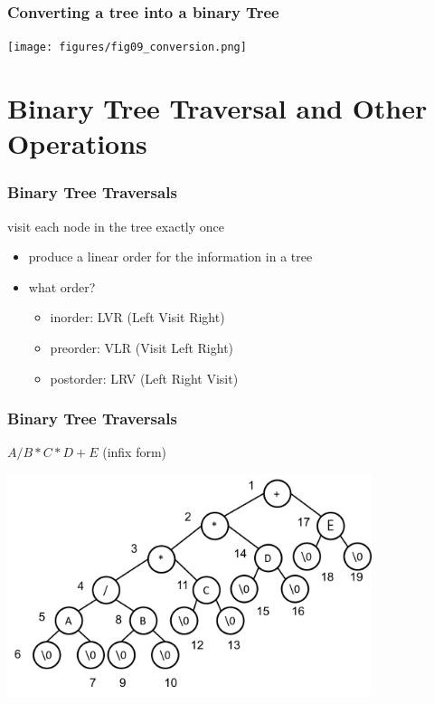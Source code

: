 \documentclass[newPxFont,sthlmFooter,nooffset]{beamer}
\begin{document}
\begin{frame}[t]
  \frametitle{Converting a tree into a binary Tree}
  \begin{center}
    \texttt{[image: figures/fig09\_conversion.png]}
  \end{center}

\end{frame}


\section{Binary Tree Traversal and Other Operations}
\begin{frame}[t]
  \frametitle{Binary Tree Traversals}
visit each node in the tree exactly once
\begin{itemize}
\item produce a linear order for the information in a tree
\item what order?
  \begin{itemize}
  \item inorder: LVR (Left Visit Right)
  \item preorder: VLR (Visit Left Right)
  \item postorder: LRV (Left Right Visit)
  \end{itemize}
\end{itemize}

\end{frame}


\begin{frame}[t]
  \frametitle{Binary Tree Traversals}
$A/B*C*D+E$ (infix form)
  \begin{center}
    \includegraphics[width=0.8\textwidth]{figures/fig10_infix.png}
  \end{center}

\end{frame}
\end{document}
